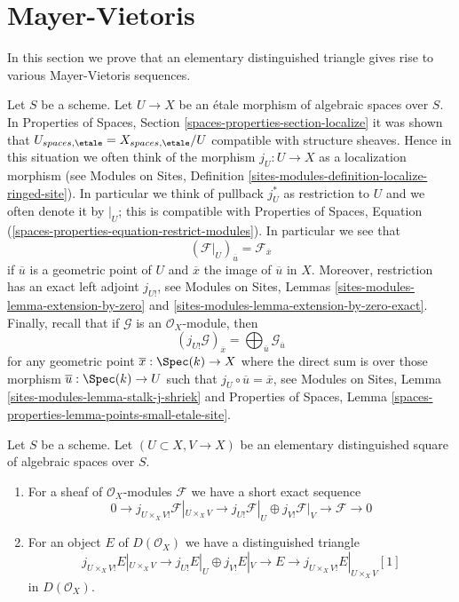 \section{Mayer-Vietoris}
\label{section-mayer-vietoris}

\noindent
In this section we prove that an elementary distinguished triangle
gives rise to various Mayer-Vietoris sequences.

\medskip\noindent
Let $S$ be a scheme. Let $U \to X$ be an \'etale morphism of algebraic
spaces over $S$. In
Properties of Spaces, Section \ref{spaces-properties-section-localize}
it was shown that
$U_{spaces, \etale} = X_{spaces, \etale}/U$
compatible with structure sheaves. Hence in this situation we
often think of the morphism $j_U : U \to X$ as a localization morphism
(see Modules on Sites, Definition
\ref{sites-modules-definition-localize-ringed-site}).
In particular we think of pullback $j_U^*$ as restriction to $U$
and we often denote it by ${}|_U$; this is compatible with
Properties of Spaces, Equation
(\ref{spaces-properties-equation-restrict-modules}).
In particular we see that
\begin{equation}
\label{equation-stalk-restriction}
(\mathcal{F}|_U)_{\overline{u}} = \mathcal{F}_{\overline{x}}
\end{equation}
if $\overline{u}$ is a geometric point of $U$ and $\overline{x}$
the image of $\overline{u}$ in $X$.
Moreover, restriction has an exact left adjoint $j_{U!}$, see
Modules on Sites, Lemmas \ref{sites-modules-lemma-extension-by-zero} and
\ref{sites-modules-lemma-extension-by-zero-exact}.
Finally, recall that if $\mathcal{G}$ is an $\mathcal{O}_X$-module,
then
\begin{equation}
\label{equation-stalk-j-shriek}
(j_{U!}\mathcal{G})_{\overline{x}} =
\bigoplus\nolimits_{\overline{u}} \mathcal{G}_{\overline{u}}
\end{equation}
for any geometric point $\overline{x} : \Spec(k) \to X$ where the
direct sum is over those morphism $\overline{u} : \Spec(k) \to U$
such that $j_U \circ \overline{u} = \overline{x}$, see
Modules on Sites, Lemma \ref{sites-modules-lemma-stalk-j-shriek}
and
Properties of Spaces, Lemma
\ref{spaces-properties-lemma-points-small-etale-site}.

\begin{lemma}
\label{lemma-exact-sequence-lower-shriek}
Let $S$ be a scheme. Let $(U \subset X, V \to X)$ be an elementary
distinguished square of algebraic spaces over $S$.
\begin{enumerate}
\item For a sheaf of $\mathcal{O}_X$-modules $\mathcal{F}$
we have a short exact sequence
$$
0 \to j_{U \times_X V!}\mathcal{F}|_{U \times_X V} \to
j_{U!}\mathcal{F}|_U \oplus j_{V!}\mathcal{F}|_V \to \mathcal{F} \to 0
$$
\item For an object $E$ of $D(\mathcal{O}_X)$ we have a distinguished
triangle
$$
j_{U \times_X V!}E|_{U \times_X V} \to
j_{U!}E|_U \oplus j_{V!}E|_V \to E \to 
j_{U \times_X V!}E|_{U \times_X V}[1]
$$
in $D(\mathcal{O}_X)$.
\end{enumerate}
\end{lemma}

